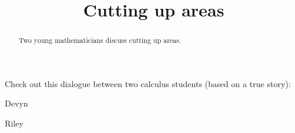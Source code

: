 \documentclass{ximera}
\title[Break-Ground:]{Cutting up areas}
\begin{document}
\begin{abstract}
Two young mathematicians discuss cutting up areas.
\end{abstract}
\maketitle

Check out this dialogue between two calculus students (based on a true
story):



\begin{dialogue}
\item[Devyn] 
\item[Riley] 
\end{dialogue}

\begin{problem}
\end{problem}


\end{document}

